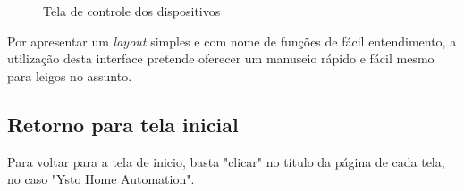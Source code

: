 \begin{figure}[H]
\caption{\label{ui-handle-device} Tela de controle dos dispositivos}
\end{figure}

Por apresentar um \textit{layout} simples e com nome de funções de fácil entendimento, a utilização desta interface pretende oferecer um manuseio rápido e fácil mesmo para leigos no assunto.

\subsection{Retorno para tela inicial}
Para voltar para a tela de inicio, basta "clicar" no título da página de cada tela, no caso "Ysto Home Automation".
